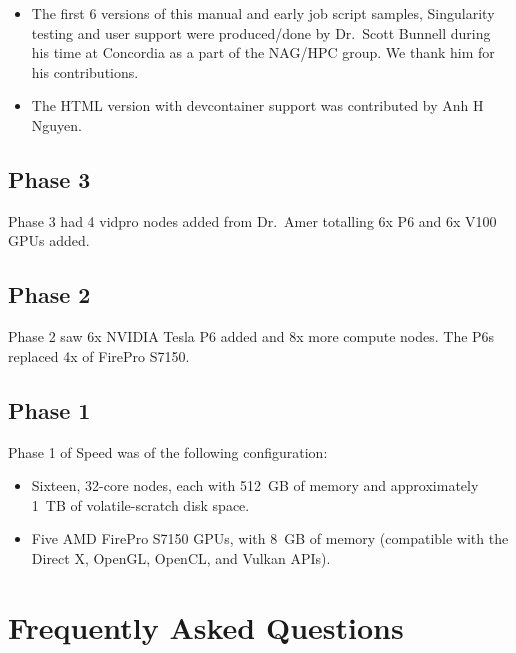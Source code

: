 \documentclass{easychair}
\begin{document}
\begin{itemize}
	\item 
The first 6 versions of this manual and early job script samples,
Singularity testing and user support were produced/done by Dr.~Scott Bunnell
during his time at Concordia as a part of the NAG/HPC group. We thank
him for his contributions.
	\item 
The HTML version with devcontainer support was contributed by Anh H Nguyen.
\end{itemize}

\subsection{Phase 3}

Phase 3 had 4 vidpro nodes added from Dr.~Amer totalling 6x P6 and 6x V100
GPUs added.

\subsection{Phase 2}

Phase 2 saw 6x NVIDIA Tesla P6 added and 8x more compute nodes.
The P6s replaced 4x of FirePro S7150.

\subsection{Phase 1}

Phase 1 of Speed was of the following configuration:

\begin{itemize}
\item
Sixteen, 32-core nodes, each with 512~GB of memory and approximately 1~TB of volatile-scratch disk space. 
\item
Five AMD FirePro S7150 GPUs, with 8~GB of memory (compatible with the Direct X, OpenGL, OpenCL, and Vulkan APIs). 
\end{itemize}

\section{Frequently Asked Questions}
\label{sect:faqs}
\end{document}
